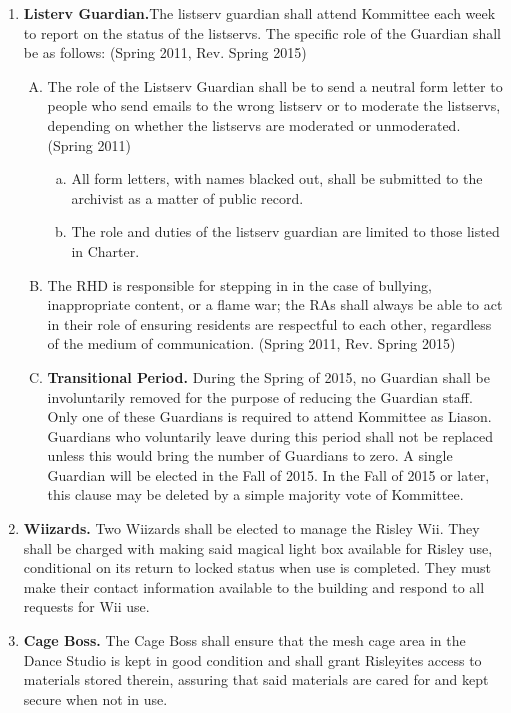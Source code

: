 \documentclass[12pt]{article}
\begin{document}
\begin{enumerate}[1.]
\item \textbf{Listerv Guardian.}The listserv guardian shall attend Kommittee each week to report on the status of the listservs. The specific role of the Guardian shall be as follows: (Spring 2011, Rev. Spring 2015)
\begin{enumerate}[A.]
\item The role of the Listserv Guardian shall be to send a neutral form letter to people who send emails to the wrong listserv or to moderate the listservs, depending on whether the listservs are moderated or unmoderated. (Spring 2011) 
\begin{enumerate}[a.]
\item All form letters, with names blacked out, shall be submitted to the archivist as a matter of public record.
\item The role and duties of the listserv guardian are limited to those listed in Charter. 
\end{enumerate}
\item The RHD is responsible for stepping in in the case of bullying, inappropriate content, or a flame war; the RAs shall always be able to act in their role of ensuring residents are respectful to each other, regardless of the medium of communication. (Spring 2011, Rev. Spring 2015)
\item \textbf{Transitional Period.} During the Spring of 2015, no Guardian shall be involuntarily removed for the purpose of reducing the Guardian staff. Only one of these Guardians is required to attend Kommittee as Liason. Guardians who voluntarily leave during this period shall not be replaced unless this would bring the number of Guardians to zero. A single Guardian will be elected in the Fall of 2015. In the Fall of 2015 or later, this clause may be deleted by a simple majority vote of Kommittee.
\end{enumerate}
\item \textbf{Wiizards.} Two Wiizards shall be elected to manage the Risley Wii. They shall be charged with making said magical light box available for Risley use, conditional on its return to locked status when use is completed. They must make their contact information available to the building and respond to all requests for Wii use.
\item \textbf{Cage Boss.} The Cage Boss shall ensure that the mesh cage area in the Dance Studio is kept in good condition and shall grant Risleyites access to materials stored therein, assuring that said materials are cared for and kept secure when not in use.
\end{enumerate}
\end{document}
